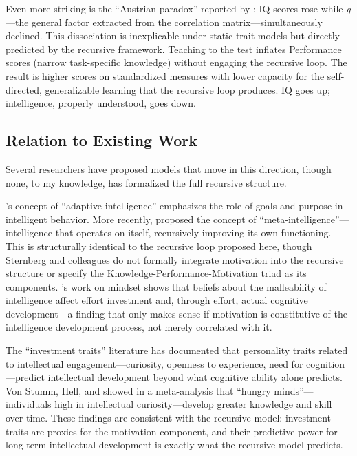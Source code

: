 \documentclass[12pt,a4paper]{article}
\begin{document}
Even more striking is the ``Austrian paradox'' reported by \citet{GignacandZajenkowski2024}: IQ scores rose while \emph{g}---\hspace{0pt}the general factor extracted from the correlation matrix---\hspace{0pt}simultaneously declined. This dissociation is inexplicable under static-trait models but directly predicted by the recursive framework. Teaching to the test inflates Performance scores (narrow task-specific knowledge) without engaging the recursive loop. The result is higher scores on standardized measures with lower capacity for the self-directed, generalizable learning that the recursive loop produces. IQ goes up; intelligence, properly understood, goes down.

\subsection{Relation to Existing Work}

Several researchers have proposed models that move in this direction, though none, to my knowledge, has formalized the full recursive structure.

\citeauthor{Sternberg2019}'s \citeyearpar{Sternberg2019} concept of ``adaptive intelligence'' emphasizes the role of goals and purpose in intelligent behavior. More recently, \citet{Sternberg2021} proposed the concept of ``meta-intelligence''---\hspace{0pt}intelligence that operates on itself, recursively improving its own functioning. This is structurally identical to the recursive loop proposed here, though Sternberg and colleagues do not formally integrate motivation into the recursive structure or specify the Knowledge-Performance-Motivation triad as its components. \citeauthor{Dweck2006}'s \citeyearpar{Dweck2006} work on mindset shows that beliefs about the malleability of intelligence affect effort investment and, through effort, actual cognitive development---\hspace{0pt}a finding that only makes sense if motivation is constitutive of the intelligence development process, not merely correlated with it.

The ``investment traits'' literature \citep{Ziegler2012,vonStummAckerman2013} has documented that personality traits related to intellectual engagement---\hspace{0pt}curiosity, openness to experience, need for cognition---\hspace{0pt}predict intellectual development beyond what cognitive ability alone predicts. Von Stumm, Hell, and \citet{ChamorroPremuzic2011} showed in a meta-analysis that ``hungry minds''---\hspace{0pt}individuals high in intellectual curiosity---\hspace{0pt}develop greater knowledge and skill over time. These findings are consistent with the recursive model: investment traits are proxies for the motivation component, and their predictive power for long-term intellectual development is exactly what the recursive model predicts.
\end{document}
